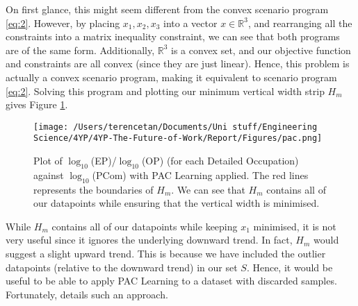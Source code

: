 \documentclass[11pt]{article}
\begin{document}
On first glance, this might seem different from the convex scenario program \ref{eq:2}. However, by placing $x_{1},x_{2},x_{3}$ into a vector $x \in \mathbb{R}^{3}$, and rearranging all the constraints into a matrix inequality constraint, we can see that both programs are of the same form. Additionally, $\mathbb{R}^{3}$ is a convex set, and our objective function and constraints are all convex (since they are just linear). Hence, this problem is actually a convex scenario program, making it equivalent to scenario program \ref{eq:2}. Solving this program and plotting our minimum vertical width strip $H_{m}$ gives Figure \ref{fig:pac}.


\begin{figure}[!htb]
	\centering
	\texttt{[image: /Users/terencetan/Documents/Uni stuff/Engineering Science/4YP/4YP-The-Future-of-Work/Report/Figures/pac.png]}
	\caption{Plot of $\log_{10}$(EP)/$\log_{10}$(OP) (for each Detailed Occupation) against $\log_{10}$(PCom) with PAC Learning applied. The red lines represents the boundaries of $H_{m}$. We can see that $H_{m}$ contains all of our datapoints while ensuring that the vertical width is minimised.}
	\label{fig:pac}
\end{figure}

While $H_{m}$ contains all of our datapoints while keeping $x_{1}$ minimised, it is not very useful since it ignores the underlying downward trend. In fact, $H_{m}$ would suggest a slight upward trend. This is because we have included the outlier datapoints (relative to the downward trend) in our set $S$. Hence, it would be useful to be able to apply PAC Learning to a dataset with discarded samples. Fortunately, \cite{9750913} details such an approach.




\newpage
\printbibliography[heading=bibintoc]
\end{document}
